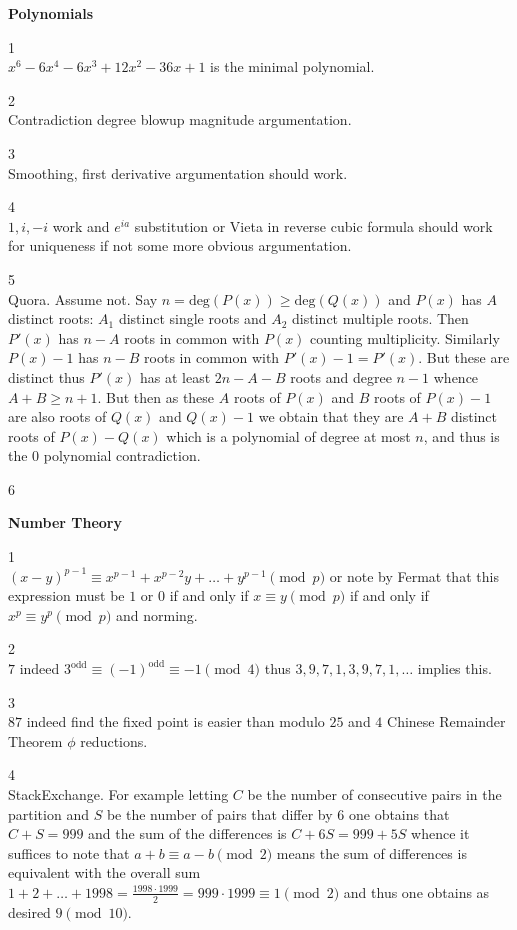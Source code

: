 \newpage

\textbf{Polynomials}

1 \\
$\boxed{x^6-6x^4-6x^3+12x^2-36x+1}$ is the minimal polynomial.

2 \\
Contradiction degree blowup magnitude argumentation.

3 \\
Smoothing, first derivative argumentation should work.

4 \\
$1,i,-i$ work and $e^{ia}$ substitution or Vieta in reverse cubic formula should work for uniqueness if not some more obvious argumentation.

5 \\
Quora. Assume not. Say $n=\text{deg}(P(x)) \ge \text{deg}(Q(x))$ and $P(x)$ has $A$ distinct roots: $A_1$ distinct single roots and $A_2$ distinct multiple roots. Then $P'(x)$ has $n-A$ roots in common with $P(x)$ counting multiplicity. Similarly $P(x)-1$ has $n-B$ roots in common with $P'(x)-1=P'(x)$. But these are distinct thus $P'(x)$ has at least $2n-A-B$ roots and degree $n-1$ whence $A+B \ge n+1$. But then as these $A$ roots of $P(x)$ and $B$ roots of $P(x)-1$ are also roots of $Q(x)$ and $Q(x)-1$ we obtain that they are $A+B$ distinct roots of $P(x)-Q(x)$ which is a polynomial of degree at most $n$, and thus is the $0$ polynomial contradiction.

6 \\


\newpage

\textbf{Number Theory}

1 \\
$(x-y)^{p-1} \equiv x^{p-1}+x^{p-2}y+\dots+y^{p-1} \pmod{p}$ or note by Fermat that this expression must be $1$ or $0$ if and only if $x \equiv y \pmod{p}$ if and only if $x^p \equiv y^p \pmod{p}$ and norming.

2 \\
$\boxed{7}$ indeed $3^{\text{odd}} \equiv (-1)^{\text{odd}} \equiv -1 \pmod{4}$ thus $3,9,7,1,3,9,7,1,\dots$ implies this.

3 \\
$\boxed{87}$ indeed find the fixed point is easier than modulo $25$ and $4$ Chinese Remainder Theorem $\phi$ reductions.

4 \\
StackExchange. For example letting $C$ be the number of consecutive pairs in the partition and $S$ be the number of pairs that differ by $6$ one obtains that $C+S=999$ and the sum of the differences is $C+6S=999+5S$ whence it suffices to note that $a+b \equiv a-b \pmod{2}$ means the sum of differences is equivalent with the overall sum $1+2+\dots+1998=\frac{1998\cdot 1999}{2}=999\cdot 1999 \equiv 1 \pmod{2}$ and thus one obtains as desired $9 \pmod{10}$.

